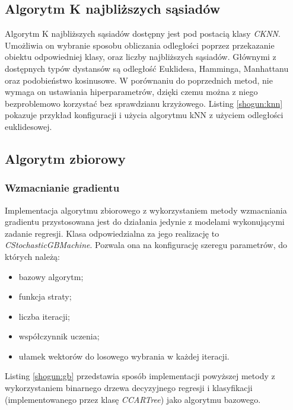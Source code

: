 \subsection{Algorytm K najbliższych sąsiadów}

Algorytm K najbliższych sąsiadów dostępny jest pod postacią klasy \textit{CKNN}. Umożliwia on wybranie sposobu obliczania odległości poprzez przekazanie obiektu odpowiedniej klasy, oraz liczby najbliższych sąsiadów. Głównymi z dostępnych typów dystansów są odległość Euklidesa, Hamminga, Manhattanu oraz podobieństwo kosinusowe. W porównaniu do poprzednich metod, nie wymaga on ustawiania hiperparametrów, dzięki czemu można z niego bezproblemowo korzystać bez sprawdzianu krzyżowego. Listing \ref{shogun:knn} pokazuje przykład konfiguracji i użycia algorytmu kNN z użyciem odległości euklidesowej.


\subsection{Algorytm zbiorowy}
\subsubsection{Wzmacnianie gradientu}
Implementacja algorytmu zbiorowego z wykorzystaniem metody wzmacniania gradientu przystosowana jest do działania jedynie z modelami wykonującymi zadanie regresji. Klasa odpowiedzialna za jego realizację to \textit{CStochasticGBMachine}. Pozwala ona na konfigurację szeregu parametrów, do których należą:

\begin{itemize}
	\item bazowy algorytm;
	\item funkcja straty;
	\item liczba iteracji;
	\item współczynnik uczenia;
	\item ułamek wektorów do losowego wybrania w każdej iteracji.
\end{itemize}

Listing \ref{shogun:gb} przedstawia sposób implementacji powyższej metody z wykorzystaniem binarnego drzewa decyzyjnego regresji i klasyfikacji (implementowanego przez klasę \textit{CCARTree}) jako algorytmu bazowego. 



